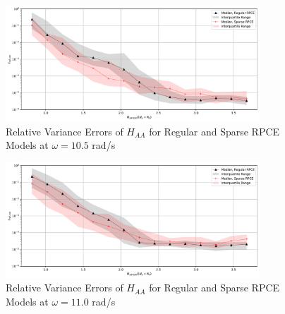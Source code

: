 \begin{figure}[H]
    \centering
    \includegraphics[width=0.85\textwidth]{
        plots/surrogate/plot_3_A_5.pdf
    }
    \caption{%
        Relative Variance Errors of $H_{AA}$ for Regular and Sparse RPCE Models at $\omega=10.5$ rad/s
    }
\end{figure}
\begin{figure}[H]
    \centering
    \includegraphics[width=0.85\textwidth]{
        plots/surrogate/plot_3_A_6.pdf
    }
    \caption{%
        Relative Variance Errors of $H_{AA}$ for Regular and Sparse RPCE Models at $\omega=11.0$ rad/s
    }
    \label{var_sRPCE_A_A_6}
\end{figure}